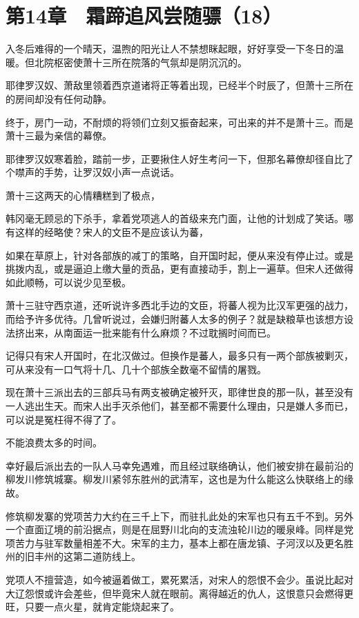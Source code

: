 \section{第14章　霜蹄追风尝随骠（18）}

入冬后难得的一个晴天，温煦的阳光让人不禁想眯起眼，好好享受一下冬日的温暖。但北院枢密使萧十三所在院落的气氛却是阴沉沉的。

耶律罗汉奴、萧敌里领着西京道诸将正等着出现，已经半个时辰了，但萧十三所在的房间却没有任何动静。

终于，房门一动，不耐烦的将领们立刻又振奋起来，可出来的并不是萧十三。而是萧十三最为亲信的幕僚。

耶律罗汉奴寒着脸，踏前一步，正要揪住人好生考问一下，但那名幕僚却径自比了个噤声的手势，让罗汉奴小声一点说话。

萧十三这两天的心情糟糕到了极点，

韩冈毫无顾忌的下杀手，拿着党项逃人的首级来充门面，让他的计划成了笑话。哪有这样的经略使？宋人的文臣不是应该认为蕃，

如果在草原上，针对各部族的减丁的策略，自开国时起，便从来没有停止过。或是挑拨内乱，或是逼迫上缴大量的贡品，更有直接动手，割上一遍草。但宋人还做得如此顺畅，可以说少见至极。

萧十三驻守西京道，还听说许多西北手边的文臣，将蕃人视为比汉军更强的战力，而给予许多优待。几曾听说过，会嫌归附蕃人太多的例子？就是缺粮草也该想方设法挤出来，从南面运一批来能有什么麻烦？不过耽搁时间而已。

记得只有宋人开国时，在北汉做过。但换作是蕃人，最多只有一两个部族被剿灭，可从来没有一口气将十几、几十个部族全数毫不留情的屠戮。

现在萧十三派出去的三部兵马有两支被确定被歼灭，耶律世良的那一队，甚至没有一人逃出生天。而宋人出手灭杀他们，甚至都不需要什么理由，只是嫌人多而已，可以说是冤枉得不得了了。

不能浪费太多的时间。

幸好最后派出去的一队人马幸免遇难，而且经过联络确认，他们被安排在最前沿的柳发川修筑城寨。柳发川紧邻东胜州的武清军，这也是为什么能这么快联络上的缘故。

修筑柳发寨的党项苦力大约在三千上下，而驻扎此处的宋军也只有五千不到。另外一个直面辽境的前沿据点，则是在屈野川北向的支流浊轮川边的暖泉峰。同样是党项苦力与驻军数量相差不大。宋军的主力，基本上都在唐龙镇、子河汊以及更名胜州的旧丰州的这第二道防线上。

党项人不擅营造，如今被逼着做工，累死累活，对宋人的怨恨不会少。虽说比起对大辽怨恨或许会差些，但毕竟宋人就在眼前。离得越近的仇人，这恨意只会燃得更旺，只要一点火星，就肯定能烧起来了。

